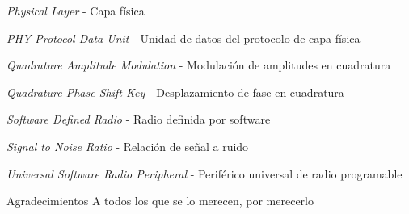 \documentclass[12pt,screen,twoside,pagebackref]{ibtesis}
\begin{document}
\begin{preliminary}
\begin{abreviaturas}
\begin{description}[labelwidth=2cm,leftmargin=!]
    \item[PHY:]   \textit{Physical Layer} - Capa física
    \item[PPDU:]  \textit{PHY Protocol Data Unit} - Unidad de datos del protocolo de capa física
    \item[QAM:]   \textit{Quadrature Amplitude Modulation} - Modulación de amplitudes en cuadratura
    \item[QPSK:]  \textit{Quadrature Phase Shift Key} - Desplazamiento de fase en cuadratura 
    \item[SDR:]   \textit{Software Defined Radio} - Radio definida por software
    \item[SNR:]   \textit{Signal to Noise Ratio} - Relación de señal a ruido
    \item[USRP:]  \textit{Universal Software Radio Peripheral} - Periférico universal de radio programable
  \end{description}
\end{abreviaturas}

\tableofcontents                %

\listoffigures                  %

\listoftables                   %



\end{preliminary}










%

\begin{biblio}

\end{biblio}


\begin{postliminary}


\begin{seccion}{Agradecimientos}
A todos los que se lo merecen, por merecerlo
\end{seccion}

\end{postliminary}
\end{document}
